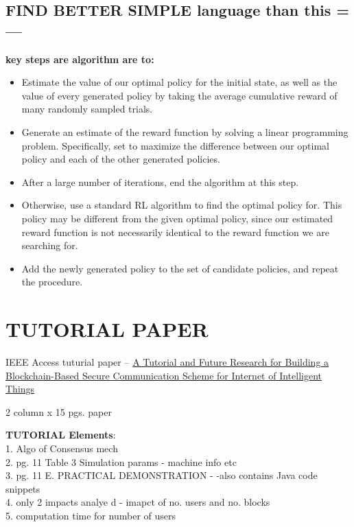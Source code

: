 \documentclass{article}
\begin{document}
\subsection{FIND BETTER SIMPLE language than this =--- }

\textbf{key steps are algorithm are to:}
\begin{itemize}
	\item Estimate the value of our optimal policy for the initial state, as well as the value of every generated policy 	by taking the average cumulative reward of many randomly sampled trials.
	
	\item Generate an estimate of the reward function by solving a linear programming problem. Specifically, set to maximize the difference between our optimal policy and each of the other generated policies.
	
	\item After a large number of iterations, end the algorithm at this step.
	
	\item Otherwise, use a standard RL algorithm to find the optimal policy for. This policy may be different from the given optimal policy, since our estimated reward function is not necessarily identical to the reward function we are searching for.
	
	\item Add the newly generated policy to the set of candidate policies, and repeat the procedure.
\end{itemize}


\section{TUTORIAL PAPER}

IEEE Access tuturial paper -- \href{https://ieeexplore.ieee.org/document/9086464}{A Tutorial and Future Research for Building a Blockchain-Based Secure Communication Scheme for Internet of Intelligent Things} 

2 column x 15 pgs. paper

\textbf{TUTORIAL Elements}:\\
1. Algo of Consensus mech\\
2. pg. 11 Table 3 Simulation params - machine info etc\\
3. pg. 11 E. PRACTICAL DEMONSTRATION - -also contains Java code snippets\\
4. only 2 impacts analye d - imapct of no. users and no. blocks \\
5. computation time for number of users\\
 
\end{document}
